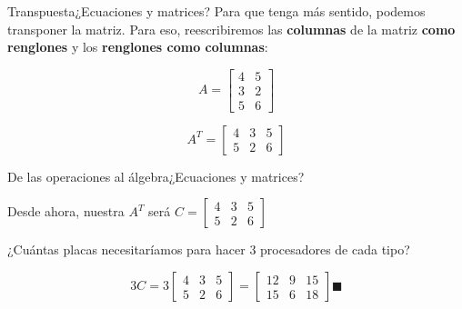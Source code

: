 \documentclass[spanish, c]{beamer}
\begin{document}
\begin{frame}{Transpuesta}{¿Ecuaciones y matrices?}
    Para que tenga más sentido, podemos \alert{transponer} la matriz.
    Para eso, reescribiremos las \textbf{columnas} de la matriz \textbf{como renglones} y los \textbf{renglones como columnas}:

    \[A = 
        \begin{bmatrix*}
            4 & 5 \\
            3 & 2 \\
            5 & 6
        \end{bmatrix*}
    \]

    \bigskip

    \[A^T = 
        \begin{bmatrix*}
            4 & 3 & 5 \\
            5 & 2 & 6
        \end{bmatrix*}
    \]

\end{frame}

\begin{frame}{De las operaciones al álgebra}{¿Ecuaciones y matrices?}

    Desde ahora, nuestra $A^T$ será $C= \begin{bmatrix*}
        4 & 3 & 5 \\
        5 & 2 & 6
    \end{bmatrix*}$

    \bigskip

    ¿Cuántas placas necesitaríamos para hacer 3 procesadores de cada tipo? \pause

    \bigskip

    \[
        3C = 3 \begin{bmatrix*}
        4 & 3 & 5 \\
        5 & 2 & 6
    \end{bmatrix*} = \begin{bmatrix*}
    12 & 9 & 15 \\
    15 & 6 & 18
\end{bmatrix*} \blacksquare
    \]    
\end{frame}
\end{document}
